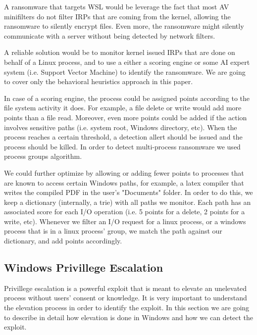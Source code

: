 \documentclass[conference]{IEEEtran}
\begin{document}
    \par{}
    A ransomware that targets WSL would be leverage the fact that most AV minifilters do not filter IRPs that are coming from the kernel, allowing
    the ransomware to silently encrypt files. Even more, the ransomware might silently communicate with a server without being detected by network
    filters.\\

    \par{}
    A reliable solution would be to monitor kernel issued IRPs that are done on behalf of a Linux process, and to use a either a scoring engine
    or some AI expert system (i.e. Support Vector Machine) to identify the ransomware. We are going to cover only the behavioral heuristics
    approach in this paper.\\

    \par{}
    In case of a scoring engine, the process could be assigned points according to the file system activity it does. For example, a file
    delete or write would add more points than a file read. Moreover, even more points could be added if the action involves sensitive paths
    (i.e. system root, Windows directory, etc). When the process reaches a certain threshold, a detection allert should be issued and the process
    should be killed. In order to detect multi-process ransomware we used process groups algorithm.\\

    \par{}
    We could further optimize by allowing or adding fewer points to processes that are known to access certain Windows paths, for example,
    a latex compiler that writes the compiled PDF in the user's "Documents" folder. In order to do this, we keep a dictionary (internally, a trie)
    with all paths we monitor. Each path has an associated score for each I/O operation (i.e. 5 points for a delete, 2 points for a write, etc).
    Whenever we filter an I/O request for a linux process, or a windows process that is in a linux process' group, we match the path against
    our dictionary, and add points accordingly.\\

    \subsection{Windows Privillege Escalation}
    Privillege escalation is a powerful exploit that is meant to elevate an unelevated process without users' consent or knowledge. It is very
    important to understand the elevation process in order to identify the exploit. In this section we are going to describe in detail how
    elevation is done in Windows and how we can detect the exploit.\\
\end{document}

